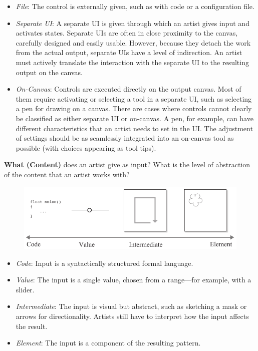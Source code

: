 \begin{itemize}
    \item \textit{File}: The control is externally given, such as with code or a configuration file.
    \item \textit{Separate UI}: A separate UI is given through which an artist gives input and activates states. Separate UIs are often in close proximity to the canvas, carefully designed and easily usable. However, because they detach the work from the actual output, separate UIs have a level of indirection. 
    An artist must actively translate the interaction with the separate UI to the resulting output on the canvas.
    \item \textit{On-Canvas}: Controls are executed directly on the output canvas. Most of them require activating or selecting a tool in a separate UI, such as selecting a pen for drawing on a canvas. 
    There are cases where controls cannot clearly be classified as either separate UI or on-canvas. A pen, for example, can have different characteristics that an artist needs to set in the UI. The adjustment of settings should be as seamlessly integrated into an on-canvas tool as possible (\eg with choices appearing as tool tips). 
\end{itemize}


\noindent\textbf{What (Content)} does an artist give as input? What is the level of abstraction of the content that an artist works with?
\begin{figure}[H]
    \centering
        \includegraphics[width=\controlParamsFigWidth\linewidth]{figures/control_paradigms/what.pdf}
\end{figure}

\begin{itemize}
    \item \textit{Code}: Input is a syntactically structured formal language.
    \item \textit{Value}: The input is a single value, chosen from a range---for example, with a slider.
    \item \textit{Intermediate}: The input is visual but abstract, such as sketching a mask or arrows for directionality. Artists still have to interpret how the input affects the result.
    \item \textit{Element}: The input is a component of the resulting pattern.
\end{itemize}

